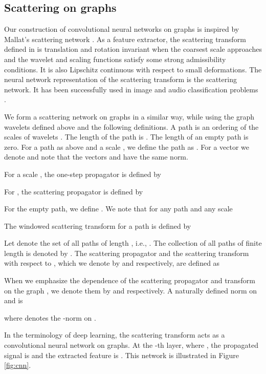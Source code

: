 \documentclass{article}
\begin{document}
\subsection{Scattering on graphs}\label{sec:scattering}
Our construction of convolutional neural networks on graphs is inspired by Mallat's scattering network \cite{Mal13}. As a feature extractor, the scattering transform defined in \cite{Mal13} is translation and rotation invariant when the coarsest scale approaches  and the wavelet and scaling functions satisfy some strong admissibility conditions. It is also Lipschitz continuous with respect to small deformations. The neural network representation of the scattering transform is the scattering network. It has been successfully used in image and audio classification problems \cite{BruM13}. 

We form a scattering network on graphs in a similar way, while using the graph wavelets defined above and the following definitions. A path  is an ordering of the scales of wavelets . The length of the path  is . The length of an empty path  is zero. For a path  as above and a scale , we define the path  as . For a vector  we denote  and note that the vectors  and  have the same norm. 

For a scale , the one-step propagator  is defined by



For , the scattering propagator  is defined by

For the empty path, we define . We note that for any path  and any scale  


The windowed scattering transform for a path  is defined by




Let  denote the set of all paths of length , i.e., . The collection of all paths of finite length is denoted by .
The scattering propagator and the scattering transform with respect to , which we denote by  and  respectively, are defined as

When we emphasize the dependence of the scattering propagator and transform on the graph , we denote them by  and  respectively. A naturally defined norm on  and  is

where  denotes the -norm on . 

In the terminology of deep learning, the scattering transform acts as a convolutional neural network on graphs. At the -th layer, where ,  the propagated signal is  and the extracted feature is . This network is illustrated in Figure \ref{fig:cnn}.
\end{document}
